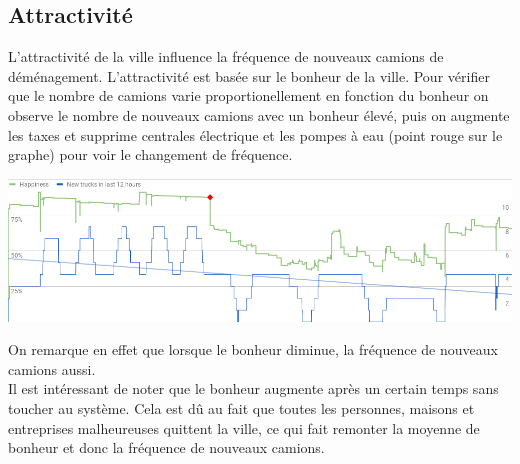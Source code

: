 \documentclass[11pt]{report}
\begin{document}
\subsection{Attractivité}
L'attractivité de la ville influence la fréquence de nouveaux camions de déménagement. L'attractivité est basée sur le bonheur de la ville.
Pour vérifier que le nombre de camions varie proportionellement en fonction du bonheur on observe le nombre de nouveaux camions avec un bonheur élevé, puis on augmente les taxes et supprime centrales électrique et les pompes à eau (point rouge sur le graphe) pour voir le changement de fréquence.
\begin{center}
	\includegraphics[width=\textwidth]{happiness_new_trucks}
\end{center}
On remarque en effet que lorsque le bonheur diminue, la fréquence de nouveaux camions aussi.\\
Il est intéressant de noter que le bonheur augmente après un certain temps sans toucher au système. Cela est dû au fait que toutes les personnes, maisons et entreprises malheureuses quittent la ville, ce qui fait remonter la moyenne de bonheur et donc la fréquence de nouveaux camions.


\newpage
\end{document}
